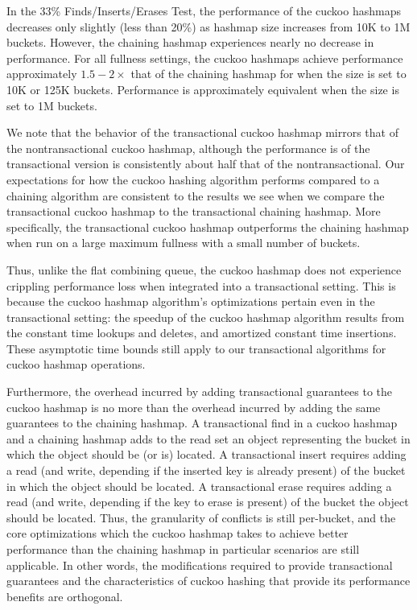 In the 33\% Finds/Inserts/Erases Test, the performance of the cuckoo hashmaps decreases only slightly (less than 20\%) as hashmap size increases from 10K to 1M buckets. However, the chaining hashmap experiences nearly no decrease in performance. For all fullness settings, the cuckoo hashmaps achieve performance approximately $1.5-2\times$ that of the chaining hashmap for when the size is set to 10K or 125K buckets. Performance is approximately equivalent when the size is set to 1M buckets.

We note that the behavior of the transactional cuckoo hashmap mirrors that of the nontransactional cuckoo hashmap, although the performance is of the transactional version is consistently about half that of the nontransactional. Our expectations for how the cuckoo hashing algorithm performs compared to a chaining algorithm are consistent to the results we see when we compare the transactional cuckoo hashmap to the transactional chaining hashmap.
More specifically, the transactional cuckoo hashmap outperforms the chaining hashmap when run on a large maximum fullness with a small number of buckets. 

Thus, unlike the flat combining queue, the cuckoo hashmap does not experience crippling performance loss when integrated into a transactional setting. This is because the cuckoo hashmap algorithm's optimizations pertain even in the transactional setting: the speedup of the cuckoo hashmap algorithm results from the constant time lookups and deletes, and amortized constant time insertions. These asymptotic time bounds still apply to our transactional algorithms for cuckoo hashmap operations.

Furthermore, the overhead incurred by adding transactional guarantees to the cuckoo hashmap is no more than the overhead incurred by adding the same guarantees to the chaining hashmap. A transactional find in a cuckoo hashmap and a chaining hashmap adds to the read set an object representing the bucket in which the object should be (or is) located.  A transactional insert requires adding a read (and write, depending if the inserted key is already present) of the bucket in which the object should be located. A transactional erase requires adding a read (and write, depending if the key to erase is present) of the bucket the object should be located. Thus, the granularity of conflicts is still per-bucket, and the core optimizations which the cuckoo hashmap takes to achieve better performance than the chaining hashmap in particular scenarios are still applicable. In other words, the modifications required to provide transactional guarantees and the characteristics of cuckoo hashing that provide its performance benefits are orthogonal.
